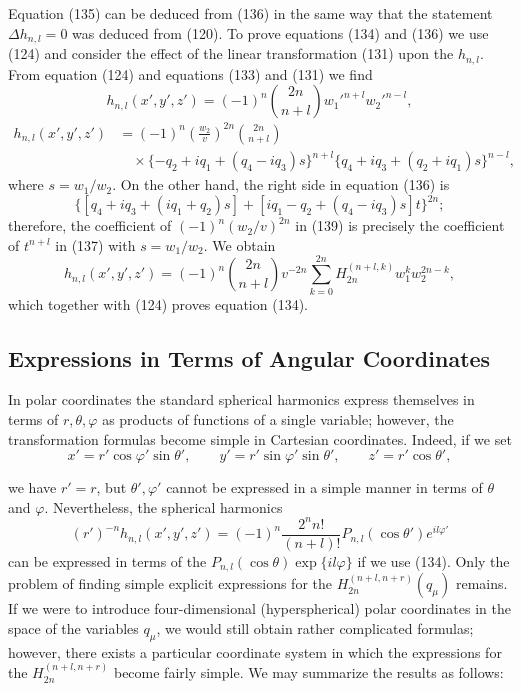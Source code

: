 Equation (135) can be deduced from (136) in the same way that the statement $\Delta h_{n,l}=0$ was deduced from (120). To prove equations (134) and (136) we use (124) and consider the effect of the linear transformation (131) upon the $h_{n,l}$. From equation (124) and equations (133) and (131) we find
\begin{equation}\tag{138}
h_{n,l}(x',y',z')=(-1)^n\binom{2n}{n+l}w_1'^{n+l}w_2'^{n-l},
\end{equation}
\begin{equation}\tag{139}
\begin{aligned}
h_{n,l}(x',y',z')
&=(-1)^n\left(\frac{w_2}{v}\right)^{2n}\binom{2n}{n+l}\\
&\quad\times\{-q_2+iq_1+(q_4-iq_3)s\}^{n+l}
\{q_4+iq_3+(q_2+iq_1)s\}^{n-l},
\end{aligned}
\end{equation}
where $s=w_1/w_2$. On the other hand, the right side in equation (136) is
\[
\{[q_4+iq_3+(iq_1+q_2)s]+[iq_1-q_2+(q_4-iq_3)s]t\}^{2n};
\]
therefore, the coefficient of $(-1)^n(w_2/v)^{2n}$ in (139) is precisely the coefficient of $t^{n+l}$ in (137) with $s=w_1/w_2$. We obtain
\begin{equation}\tag{140}
h_{n,l}(x',y',z')=(-1)^n\binom{2n}{n+l}v^{-2n}
\sum_{k=0}^{2n}H_{2n}^{(n+l,k)}w_1^kw_2^{2n-k},
\end{equation}
which together with (124) proves equation (134).

\subsection{Expressions in Terms of Angular Coordinates}
In polar coordinates the standard spherical harmonics express themselves in terms of $r,\theta,\varphi$ as products of functions of a single variable; however, the transformation formulas become simple in Cartesian coordinates. Indeed, if we set
\begin{equation}\tag{141}
x'=r'\cos\varphi'\sin\theta',\qquad
y'=r'\sin\varphi'\sin\theta',\qquad
z'=r'\cos\theta',
\end{equation}

we have $r'=r$, but $\theta',\varphi'$ cannot be expressed in a simple manner in terms of $\theta$ and $\varphi$. Nevertheless, the spherical harmonics
\[
(r')^{-n}h_{n,l}(x',y',z')=(-1)^n\frac{2^nn!}{(n+l)!}P_{n,l}(\cos\theta')e^{il\varphi'}
\]
can be expressed in terms of the $P_{n,l}(\cos\theta)\exp\{il\varphi\}$ if we use (134). Only the problem of finding simple explicit expressions for the $H_{2n}^{(n+l,n+r)}(q_\mu)$ remains. If we were to introduce four-dimensional (hyperspherical) polar coordinates in the space of the variables $q_\mu$, we would still obtain rather complicated formulas; however, there exists a particular coordinate system in which the expressions for the $H_{2n}^{(n+l,n+r)}$ become fairly simple. We may summarize the results as follows:

